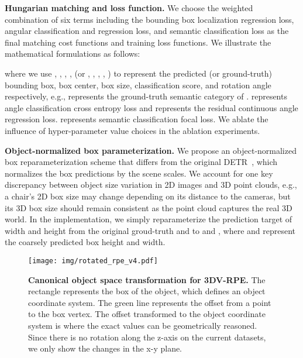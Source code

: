 \documentclass[10pt,twocolumn,letterpaper]{article}
\begin{document}
\vspace{1mm}
\noindent\textbf{Hungarian matching and loss function.}
We choose the weighted combination of six terms including the bounding box localization regression loss, angular classification and regression loss, and semantic classification loss as the final matching cost functions and training loss functions.
We illustrate the mathematical formulations
as follows:

where we use , , , ,  (or , , , , ) to represent the predicted (or ground-truth) bounding box, box center, box size, classification score, and rotation angle respectively, e.g.,
 represents the ground-truth semantic category of .
 represents angle classification cross entropy loss and  represents the residual continuous angle regression loss.
 represents semantic classification focal loss.
We ablate the influence of hyper-parameter value choices in the ablation experiments.


\vspace{1mm}
\noindent\textbf{Object-normalized box parameterization.}
We propose an object-normalized box reparameterization scheme that differs from the original DETR~\cite{carion2020end}, which normalizes the box predictions by the scene scales.
We account for one key discrepancy between object size variation in 2D images and 3D point clouds, e.g., a chair's 2D box size may change depending on its distance to the cameras, but its 3D box size should remain consistent as the point cloud captures the real 3D world.
In the implementation, we simply reparameterize the prediction target of width and height from the original groud-truth  and  to  and , where  and  represent the coarsely predicted box height and width.



\begin{figure}[t]
\centering
\texttt{[image: img/rotated\_rpe\_v4.pdf]}
\caption{\small{\textbf{Canonical object space transformation for 3DV-RPE.}
The rectangle represents the box of the object, which defines an object coordinate system. The green line represents the offset from a point to the box vertex. The offset transformed to the object coordinate system is  where the exact values can be geometrically reasoned. Since there is no rotation along the z-axis on the current datasets, we only show the changes in the x-y plane.}}
\label{fig:rotatedRPE}
\vspace{-2mm}
\end{figure}


\vspace{3mm}
\end{document}
